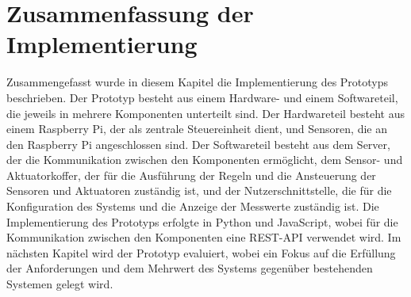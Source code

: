\section{Zusammenfassung der Implementierung}
Zusammengefasst wurde in diesem Kapitel die Implementierung des Prototyps beschrieben.
Der Prototyp besteht aus einem Hardware- und einem Softwareteil, die jeweils in mehrere Komponenten unterteilt sind.
Der Hardwareteil besteht aus einem Raspberry Pi, der als zentrale Steuereinheit dient, und Sensoren, die an den Raspberry Pi angeschlossen sind.
Der Softwareteil besteht aus dem Server, der die Kommunikation zwischen den Komponenten ermöglicht, dem Sensor- und Aktuatorkoffer, der für die Ausführung der Regeln und die Ansteuerung der Sensoren und Aktuatoren zuständig ist, und der Nutzerschnittstelle, die für die Konfiguration des Systems und die Anzeige der Messwerte zuständig ist.
Die Implementierung des Prototyps erfolgte in Python und JavaScript, wobei für die Kommunikation zwischen den Komponenten eine REST-API verwendet wird.
Im nächsten Kapitel wird der Prototyp evaluiert, wobei ein Fokus auf die Erfüllung der Anforderungen und dem Mehrwert des Systems gegenüber bestehenden Systemen gelegt wird.

